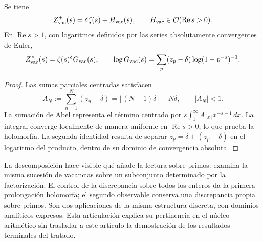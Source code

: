 \begin{proposition}
Se tiene
\[
 Z_{\rm vac}^{+}(s)=\delta\zeta(s)+H_{\rm vac}(s),
 \qquad H_{\rm vac}\in\mathcal O(\operatorname{Re}s>0).
\]
En \(\operatorname{Re}s>1\), con logaritmos definidos por las series
absolutamente convergentes de Euler,
\[
 Z_{\rm vac}^{\times}(s)=\zeta(s)^\delta G_{\rm vac}(s),\qquad
 \log G_{\rm vac}(s)=
 \sum_p(z_p-\delta)\log(1-p^{-s})^{-1}.
\]
\end{proposition}
\begin{proof}
Las sumas parciales centradas satisfacen
\[
 A_N:=\sum_{n=1}^N(z_n-\delta)
 =\lfloor(N+1)\delta\rfloor-N\delta,\qquad |A_N|<1.
\]
La sumación de Abel representa el término centrado por
\(s\int_1^\infty A_{\lfloor x\rfloor}x^{-s-1}\,dx\). La integral
converge localmente de manera uniforme en \(\operatorname{Re}s>0\),
lo que prueba la holomorfía. La segunda identidad resulta de separar
\(z_p=\delta+(z_p-\delta)\) en el logaritmo del producto, dentro de
su dominio de convergencia absoluta.
\end{proof}

La descomposición hace visible qué añade la lectura sobre primos: examina
la misma sucesión de vacancias sobre un subconjunto determinado por la
factorización. El control de la discrepancia sobre todos los enteros da
la primera prolongación holomorfa; el segundo observable conserva una
discrepancia propia sobre primos. Son dos aplicaciones de la misma
estructura discreta, con dominios analíticos expresos. Esta articulación
explica su pertinencia en el núcleo aritmético sin trasladar a este
artículo la demostración de los resultados terminales del tratado.

